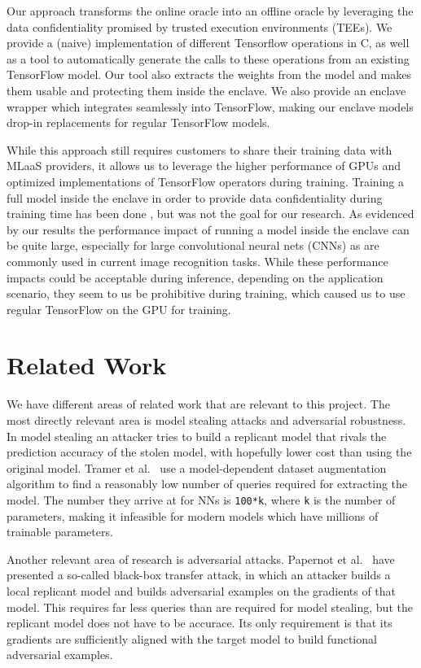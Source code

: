 \documentclass[11pt,twocolumn]{article}
\newcommand{\tf}{TensorFlow}
\begin{document}
Our approach transforms the online oracle into an offline oracle by leveraging the data confidentiality promised by trusted execution environments (TEEs).
We provide a (naive) implementation of different Tensorflow operations in C, as well as a tool to automatically generate the calls to these operations from an existing \tf{} model.
Our tool also extracts the weights from the model and makes them usable and protecting them inside the enclave.
We also provide an enclave wrapper which integrates seamlessly into \tf{}, making our enclave models drop-in replacements for regular \tf{} models.

While this approach still requires customers to share their training data with MLaaS providers, it allows us to leverage the higher performance of GPUs and optimized implementations of \tf{} operators during training.
Training a full model inside the enclave in order to provide data confidentiality during training time has been done \cite{ohrimenko_oblivious_2016}, but was not the goal for our research.
As evidenced by our results the performance impact of running a model inside the enclave can be quite large, especially for large convolutional neural nets (CNNs) as are commonly used in current image recognition tasks.
While these performance impacts could be acceptable during inference, depending on the application scenario, they seem to us be prohibitive during training, which caused us to use regular \tf{} on the GPU for training.

\section{Related Work}
\label{sec:related}

We have different areas of related work that are relevant to this project.
The most directly relevant area is model stealing attacks and adversarial robustness.
In model stealing an attacker tries to build a replicant model that rivals the prediction accuracy of the stolen model, with hopefully lower cost than using the original model.
Tramer et al.~\cite{tramer_stealing_2016} use a model-dependent dataset augmentation algorithm to find a reasonably low number of queries required for extracting the model.
The number they arrive at for NNs is \texttt{100*k}, where \texttt{k} is the number of parameters, making it infeasible for modern models which have millions of trainable parameters.

Another relevant area of research is adversarial attacks.
Papernot et al.~\cite{papernot_practical_2017} have presented a so-called black-box transfer attack, in which an attacker builds a local replicant model and builds adversarial examples on the gradients of that model.
This requires far less queries than are required for model stealing, but the replicant model does not have to be accurace.
Its only requirement is that its gradients are sufficiently aligned with the target model to build functional adversarial examples.
\end{document}
